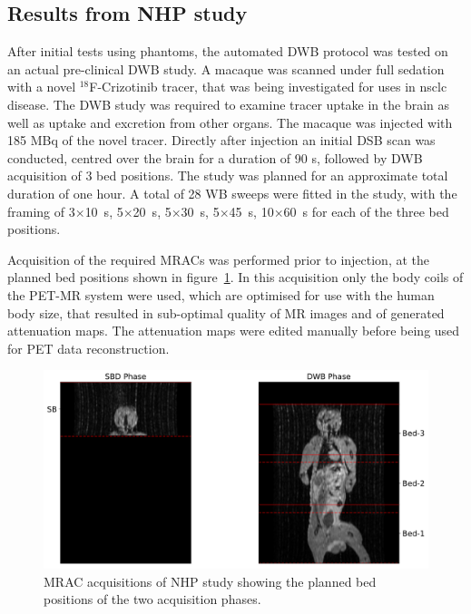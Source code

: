 \subsection{Results from NHP study}
After initial tests using phantoms, the automated DWB protocol was tested on an actual pre-clinical DWB study. A macaque was scanned under full sedation with a novel $^{18}$F-Crizotinib tracer, that was being investigated for uses in \gls{nsclc} disease. The DWB study was required to examine tracer uptake in the brain as well as uptake and excretion from other organs. The macaque was injected with 185 \si{\mega \becquerel} of the novel tracer. Directly after injection an initial DSB scan was conducted, centred over the brain for a duration of 90 s, followed by DWB acquisition of 3 bed positions. The study was planned for an approximate total duration of one hour. A total of 28 WB sweeps were fitted in the study, with the framing of 3$\times$10~\si{\s}, 5$\times$20~\si{\s}, 5$\times$30~\si{\s}, 5$\times$45~\si{\s}, 10$\times$60~\si{\s} for each of the three bed positions.

Acquisition of the required MRACs was performed prior to injection, at the planned bed positions shown in figure~\ref{fig3_1:Macaque_MRI}. In this acquisition only the body coils of the PET-MR system were used, which are optimised for use with the human body size, that resulted in sub-optimal quality of MR images and of generated attenuation maps. The attenuation maps were edited manually before being used for PET data reconstruction.

\begin{figure} [ht!]
\centering
\includegraphics[scale=0.5,angle=0]{3_Results/3_1_DWB_Optimization/figures/3_1_Macaque_MRI.pdf}
\caption{MRAC acquisitions of NHP study showing the planned bed positions of the two acquisition phases.}
\label{fig3_1:Macaque_MRI}
\end{figure}

